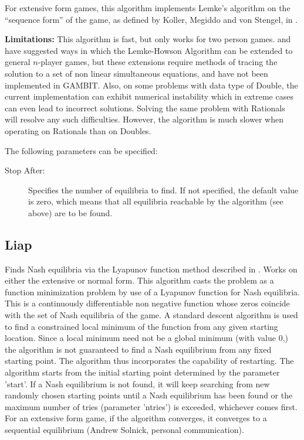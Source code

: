 For extensive form games, this algorithm implements Lemke's algorithm
on the ``sequence form'' of the game, as defined by Koller, Megiddo
and von Stengel, in \cite{KolMegSte:94}.

{\bf Limitations:} This algorithm is fast, but only works for two
person games.  \cite{Wilson:1971} and \cite{Rosenmuller:1971} have
suggested ways in which the Lemke-Howson Algorithm can be extended to
general $n$-player games, but these extensions require methods of
tracing the solution to a set of non linear simultaneous equations,
and have not been implemented in GAMBIT.  Also, on some problems with
data type of Double, the current implementation can exhibit numerical
instability which in extreme cases can even lead to incorrect
solutions.  Solving the same problem with Rationals will resolve any
such difficulties.  However, the algorithm is much slower when
operating on Rationals than on Doubles.

The following parameters can be specified:

\begin{description}
\item[Stop After:] Specifies the number of equilibria to find.  If not
specified, the default value is zero, which means that all equilibria
reachable by the algorithm (see above) are to be found.
\end{description}

\subsection{Liap}\label{Liap}
Finds Nash equilibria via the Lyapunov function method
described in \cite{McK:91}.  Works on either the extensive or normal
form.  This algorithm casts the problem as a function minimization
problem by use of a Lyapunov function for Nash equilibria.  This is a
continuously differentiable non negative function whose zeros coincide
with the set of Nash equilibria of the game.  A standard descent
algorithm is used to find a constrained local minimum of the function
from any given starting location.  Since a local minimum need not be a
global minimum (with value 0,) the algorithm is not guaranteed to find
a Nash equilibrium from any fixed starting point.  The algorithm thus
incorporates the capability of restarting.  The algorithm starts from
the initial starting point determined by the parameter 'start'.  If a
Nash equilibrium is not found, it will keep searching from new
randomly chosen starting points until a Nash equilibrium has been
found or the maximum number of tries (parameter 'ntries') is exceeded,
whichever comes first.  For an extensive form game, if the algorithm
converges, it converges to a sequential equilibrium (Andrew Solnick,
personal communication).

